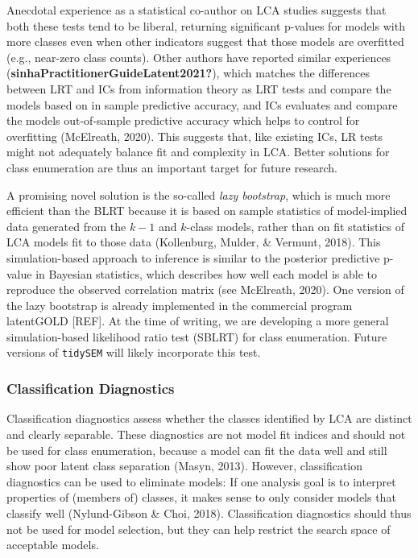 \documentclass[
  ,man,floatsintext]{apa6}
\begin{document}
Anecdotal experience as a statistical co-author on LCA studies suggests
that both these tests tend to be liberal, returning significant p-values
for models with more classes even when other indicators suggest that
those models are overfitted (e.g., near-zero class counts). Other
authors have reported similar experiences
(\textbf{sinhaPractitionerGuideLatent2021?}), which matches the differences
between LRT and ICs from information theory as LRT tests and compare the
models based on in sample predictive accuracy, and ICs evaluates and
compare the models out-of-sample predictive accuracy which helps to
control for overfitting (McElreath, 2020). This suggests
that, like existing ICs, LR tests might not adequately balance fit and
complexity in LCA. Better solutions for class enumeration are thus an
important target for future research.

A promising novel solution is the so-called \emph{lazy bootstrap}, which is
much more efficient than the BLRT because it is based on sample
statistics of model-implied data generated from the \(k-1\) and \(k\)-class
models, rather than on fit statistics of LCA models fit to those data
(Kollenburg, Mulder, \& Vermunt, 2018). This simulation-based approach to inference
is similar to the posterior predictive p-value in Bayesian statistics,
which describes how well each model is able to reproduce the observed
correlation matrix (see McElreath, 2020). One version of the
lazy bootstrap is already implemented in the commercial program
latentGOLD {[}REF{]}. At the time of writing, we are developing a more
general simulation-based likelihood ratio test (SBLRT) for class
enumeration. Future versions of \texttt{tidySEM} will likely incorporate this
test.

\hypertarget{classification-diagnostics}{%
\subsubsection{Classification Diagnostics}\label{classification-diagnostics}}

Classification diagnostics assess whether the classes identified by LCA
are distinct and clearly separable. These diagnostics are not model fit
indices and should not be used for class enumeration, because a model
can fit the data well and still show poor latent class separation
(Masyn, 2013). However, classification diagnostics can be used to
eliminate models: If one analysis goal is to interpret properties of
(members of) classes, it makes sense to only consider models that
classify well (Nylund-Gibson \& Choi, 2018). Classification diagnostics
should thus not be used for model selection, but they can help restrict
the search space of acceptable models.
\end{document}
